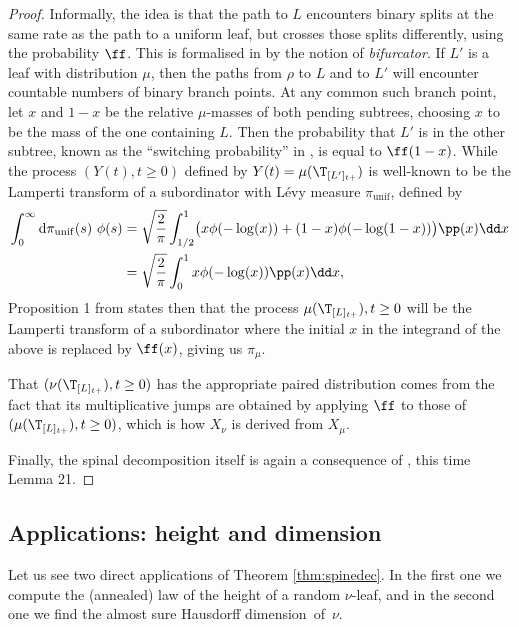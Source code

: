\begin{proof}
Informally, the idea is that the path to $L$ encounters binary splits at the same rate as the path to a uniform leaf, but crosses those splits differently, using the probability $\ff$. This is formalised in \cite{PitmanWinkel2013} by the notion of \emph{bifurcator}. If $L'$ is a leaf with distribution $\mu$, then the paths from $\rho$ to $L$ and to $L'$ will encounter countable numbers of binary branch points. At any common such branch point, let $x$ and $1-x$ be the relative $\mu$-masses of both pending subtrees, choosing $x$ to be the mass of the one containing $L$. Then the probability that $L'$ is in the other subtree, known as the ``switching probability'' in \cite{PitmanWinkel2013}, is equal to $\ff(1-x)$. While the process $(Y(t),t\geq 0)$ defined by $Y(t)=\mu(\T_{[L']_{t+}})$ is well-known \cite[\S 4]{bertoin2002self} to be the Lamperti transform of a subordinator with Lévy measure $\pi_{\mathrm{unif}}$, defined by
\begin{align*}
\int_{0}^{\infty} \mathrm{d} \pi_{\mathrm{unif}}(s) \ \phi(s) &= \sqrt{\frac{2}{\pi}} \int_{1/2}^{1} \bigl(x \phi(-\log (x)) + (1-x) \phi(-\log (1-x))\bigr)\pp(x)\dd x \\
&= \sqrt{\frac{2}{\pi}} \int_0^{1} x \phi(-\log (x))\pp(x)\dd x,
\end{align*}
Proposition 1 from \cite{PitmanWinkel2013} states then that the process $\mu(\T_{[L]_{t+}}),t\geq 0$ will be the Lamperti transform of a subordinator where the initial $x$ in the integrand of the above is replaced by $\ff(x)$, giving us $\pi_\mu$.

That $(\nu(\T_{[L]_{t+}}),t\geq 0)$ has the appropriate paired distribution comes from the fact that its multiplicative jumps are obtained by applying $\ff$ to those of $(\mu(\T_{[L]_{t+}}),t\geq 0)$, which is how $X_{\nu}$ is derived from $X_{\mu}$.

Finally, the spinal decomposition itself is again a consequence of \cite{PitmanWinkel2013}, this time Lemma 21.
\end{proof}
\subsection{Applications: height and dimension}

Let us see two direct applications of Theorem \ref{thm:spinedec}. In the first one we compute the (annealed) law of the height of a random $\nu$-leaf, and in the second one we find the almost sure Hausdorff dimension~of~$\nu$.

